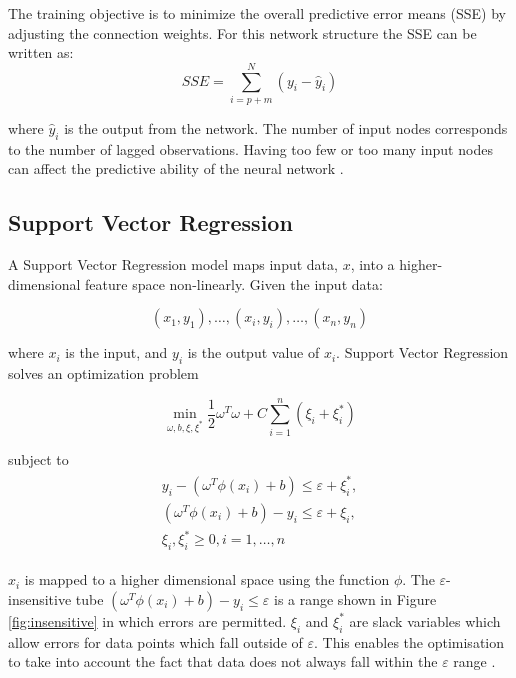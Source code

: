The training objective is to minimize the overall predictive error means (SSE) by adjusting the connection weights. For this network structure the SSE can be written as:
\begin{equation}
SSE = \sum_{i=p+m}^N(y_i-\hat{y}_i)
\end{equation}

\noindent where $\hat{y}_i$ is the output from the network. The number of input nodes corresponds to the number of lagged observations. Having too few or too many input nodes can affect the predictive ability of the neural network \cite{Pao2007}.




\subsection{Support Vector Regression}

A Support Vector Regression model maps input data, $x$, into a higher-dimensional feature space non-linearly. Given the input data:

\begin{equation}
(x_1,y_1), \ldots,(x_i,y_i),\ldots,(x_n,y_n) 
\end{equation}

\noindent where $x_i$ is the input, and $y_i$ is the output value of $x_i$. Support Vector Regression solves an optimization problem \cite{Shu2006,Chen2004}

\begin{equation}
\min_{\omega,b,\xi,\xi^{*}}\frac{1}{2}\omega^T\omega+C\sum_{i=1}^{n}(\xi_i+\xi_i^*)
\end{equation}

\noindent subject to
\begin{align}
\begin{multlined}
\label{svr:constrains}
y_i-(\omega^T\phi(x_i)+b)\leq\varepsilon+\xi_i^{*},\\
(\omega^T\phi(x_i)+b)-y_i\leq\varepsilon+\xi_i,\\
\xi_i,\xi^*_i\geq0,i=1,\ldots,n
\end{multlined}
\end{align}


\noindent $x_i$ is mapped to a higher dimensional space using the function $\phi$. The $\varepsilon$-insensitive tube $(\omega^T\phi(x_i)+b)-y_i\leq\varepsilon$ is a range shown in Figure \ref{fig:insensitive} in which errors are permitted. $\xi_i$ and $\xi^*_i$ are slack variables which allow errors for data points which fall outside of $\varepsilon$. This enables the optimisation to take into account the fact that data does not always fall within the $\varepsilon$ range \cite{Smola2004}.

